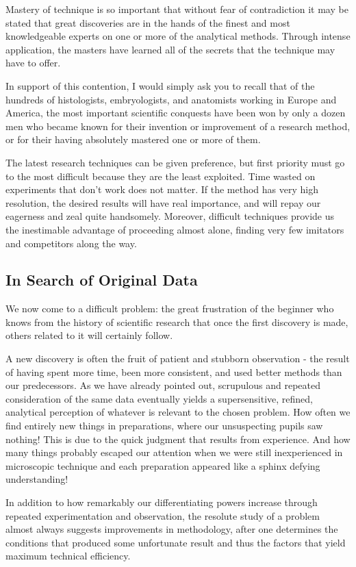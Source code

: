 \documentclass{article}
\begin{document}
Mastery of technique is so important that without fear of contradiction it may be stated that great discoveries are in the hands of the finest and most knowledgeable experts on one or more of the analytical methods. Through intense application, the masters have learned all of the secrets that the technique may have to offer.

In support of this contention, I would simply ask you to recall that of the hundreds of histologists, embryologists, and anatomists working in Europe and America, the most important scientific conquests have been won by only a dozen men who became known for their invention or improvement of a research method, or for their having absolutely mastered one or more of them.

The latest research techniques can be given preference, but first priority must go to the most difficult because they are the least exploited. Time wasted on experiments that don’t work does not matter. If the method has very high resolution, the desired results will have real importance, and will repay our eagerness and zeal quite handsomely. Moreover, difficult techniques provide us the inestimable advantage of proceeding almost alone, finding very few imitators and competitors along the way.

\subsection*{In Search of Original Data}

We now come to a difficult problem: the great frustration of the beginner who knows from the history of scientific research that once the first discovery is made, others related to it will certainly follow.

A new discovery is often the fruit of patient and stubborn observation - the result of having spent more time, been more consistent, and used better methods than our predecessors. As we have already pointed out, scrupulous and repeated consideration of the same data eventually yields a supersensitive, refined, analytical perception of whatever is relevant to the chosen problem. How often we find entirely new things in preparations, where our unsuspecting pupils saw nothing! This is due to the quick judgment that results from experience. And how many things probably escaped our attention when we were still inexperienced in microscopic technique and each preparation appeared like a sphinx defying understanding!

In addition to how remarkably our differentiating powers increase through repeated experimentation and observation, the resolute study of a problem almost always suggests improvements in methodology, after one determines the conditions that produced some unfortunate result and thus the factors that yield maximum technical efficiency.
\end{document}
